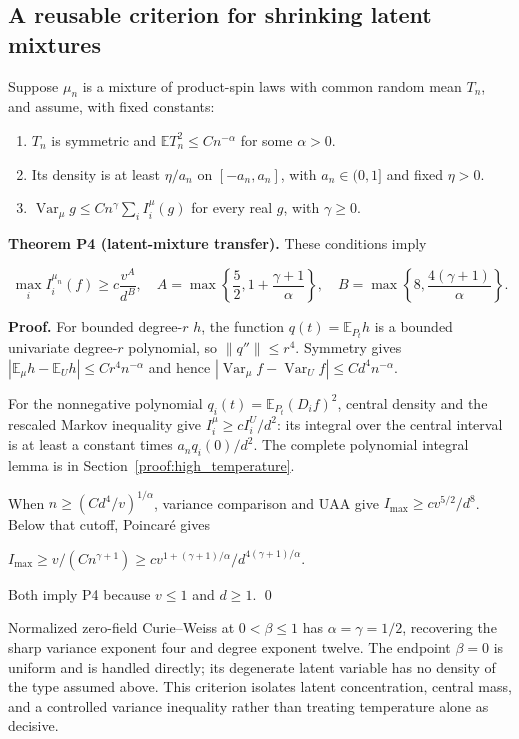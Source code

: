 \subsection{A reusable criterion for shrinking latent
mixtures}\label{proof:positive_structure:a-reusable-criterion-for-shrinking-latent-mixtures}

Suppose \(\mu _n\) is a mixture of product-spin laws with common random
mean \(T_n\), and assume, with fixed constants:

\begin{enumerate}
\def\labelenumi{\arabic{enumi}.}
\tightlist
\item
  \(T_n\) is symmetric and \(\mathbb{E} T_n^2\le C n^{-\alpha }\) for
  some \(\alpha >0\).
\item
  Its density is at least \(\eta /a_n\) on \([-a_n,a_n]\), with
  \(a_n \in (0,1]\) and fixed \(\eta >0\).
\item
  \(\operatorname{Var}_\mu  g\le C n^\gamma  \sum_i I_i^\mu (g)\) for
  every real \(g\), with \(\gamma \ge 0\).
\end{enumerate}

\textbf{Theorem P4 (latent-mixture transfer).} These conditions imply

\[
\max_i I_i^{\mu_n}(f)\ge c\frac{v^A}{d^B},
\quad A=\max\left\{\frac52,1+\frac{\gamma+1}{\alpha}\right\},
\quad B=\max\left\{8,\frac{4(\gamma+1)}{\alpha}\right\}.
\tag{P4}
\]

\textbf{Proof.} For bounded degree-\(r\) \(h\), the function
\(q(t)=\mathbb{E}_{P_t}h\) is a bounded univariate degree-\(r\)
polynomial, so \(\lVert q''\rVert\le r^4\). Symmetry gives
\(|\mathbb{E}_\mu  h-\mathbb{E}_U h|\le C r^4n^{-\alpha }\) and hence
\(|\operatorname{Var}_\mu  f-\operatorname{Var}_U f|\le C d^4n^{-\alpha }\).

For the nonnegative polynomial \(q_i(t)=\mathbb{E}_{P_t}(D_i f)^2\),
central density and the rescaled Markov inequality give
\(I_i^\mu \ge c I_i^U/d^2\): its integral over the central interval is
at least a constant times \(a_n q_i(0)/d^2\). The complete polynomial
integral lemma is in Section~\ref{proof:high_temperature}.

When \(n\ge (C d^4/v)^{1/\alpha }\), variance comparison and UAA give
\(I_{\max}\ge c v^{5/2}/d^8\). Below that cutoff, Poincaré gives

\(I_{\max}\ge v/(C n^{\gamma +1})\ge c v^{1+(\gamma +1)/\alpha }/d^{4(\gamma +1)/\alpha }\).

Both imply P4 because \(v\le 1\) and \(d\ge 1\). \qed

Normalized zero-field Curie--Weiss at \(0<\beta \le 1\) has
\(\alpha =\gamma =1/2\), recovering the sharp variance exponent four and
degree exponent twelve. The endpoint \(\beta =0\) is uniform and is
handled directly; its degenerate latent variable has no density of the
type assumed above. This criterion isolates latent concentration,
central mass, and a controlled variance inequality rather than treating
temperature alone as decisive.
